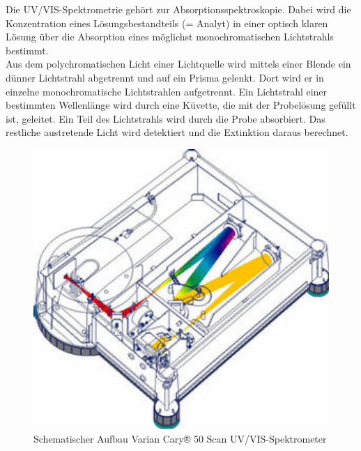 Die UV/VIS-Spektrometrie gehört zur Absorptionsspektroskopie. Dabei wird die Konzentration
eines Lösungsbestandteils (= Analyt) in einer optisch klaren Lösung über die Absorption
eines möglichst monochromatischen Lichtstrahls bestimmt.\\
Aus dem polychromatischen Licht einer Lichtquelle wird mittels einer Blende ein dünner
Lichtstrahl abgetrennt und auf ein Prisma gelenkt. Dort wird er in einzelne monochromatische
Lichtstrahlen aufgetrennt. Ein Lichtstrahl einer bestimmten Wellenlänge wird
durch eine Küvette, die mit der Probelösung gefüllt ist, geleitet. Ein Teil des Lichtstrahls wird
durch die Probe absorbiert. Das restliche austretende Licht wird detektiert und die Extinktion
daraus berechnet.
\begin{figure}[htbp]
    \centering
        \includegraphics[width=1.00\textwidth]{../Bilder/AufbauSpektrometer.jpg}
    \caption{Schematischer Aufbau Varian Cary® 50 Scan UV/VIS-Spektrometer \cite{UV-VIS}}
    \label{fig:AufbauSpektrometer}
\end{figure}

